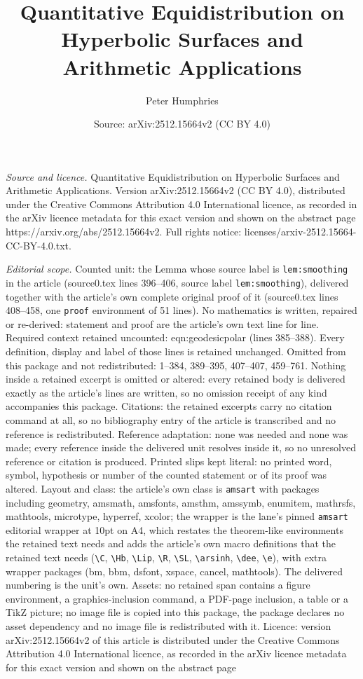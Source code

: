 \documentclass[10pt,a4paper]{amsart}
\title[Quantitative Equidistribution on Hyperbolic Surfaces and Ari]{Quantitative Equidistribution on Hyperbolic Surfaces and Arithmetic Applications}
\author{Peter Humphries}
\date{Source: arXiv:2512.15664v2 (CC BY 4.0)}
\begin{document}
\maketitle

\noindent\emph{Source and licence.} Quantitative Equidistribution on Hyperbolic Surfaces and Arithmetic Applications. Version arXiv:2512.15664v2 (CC BY 4.0), distributed under the Creative Commons Attribution 4.0 International licence, as recorded in the arXiv licence metadata for this exact version and shown on the abstract page https://arxiv.org/abs/2512.15664v2. Full rights notice: licenses/arxiv-2512.15664-CC-BY-4.0.txt.\par\smallskip

\noindent\textit{Editorial scope.} Counted unit: the Lemma whose source label is \texttt{lem:smoothing} in the article (source0.tex lines 396--406, source label \texttt{lem:smoothing}), delivered together with the article's own complete original proof of it (source0.tex lines 408--458, one \texttt{proof} environment of 51 lines). No mathematics is written, repaired or re-derived: statement and proof are the article's own text line for line. Required context retained uncounted: eqn:geodesicpolar (lines 385--388). Every definition, display and label of those lines is retained unchanged. Omitted from this package and not redistributed: 1--384, 389--395, 407--407, 459--761. Nothing inside a retained excerpt is omitted or altered: every retained body is delivered exactly as the article's lines are written, so no omission receipt of any kind accompanies this package. Citations: the retained excerpts carry no citation command at all, so no bibliography entry of the article is transcribed and no reference is redistributed. Reference adaptation: none was needed and none was made; every reference inside the delivered unit resolves inside it, so no unresolved reference or citation is produced. Printed slips kept literal: no printed word, symbol, hypothesis or number of the counted statement or of its proof was altered. Layout and class: the article's own class is \texttt{amsart} with packages including geometry, amsmath, amsfonts, amsthm, amssymb, enumitem, mathrsfs, mathtools, microtype, hyperref, xcolor; the wrapper is the lane's pinned \texttt{amsart} editorial wrapper at 10pt on A4, which restates the theorem-like environments the retained text needs and adds the article's own macro definitions that the retained text needs (\texttt{\textbackslash C}, \texttt{\textbackslash Hb}, \texttt{\textbackslash Lip}, \texttt{\textbackslash R}, \texttt{\textbackslash SL}, \texttt{\textbackslash arsinh}, \texttt{\textbackslash dee}, \texttt{\textbackslash e}), with extra wrapper packages (bm, bbm, dsfont, xspace, cancel, mathtools). The delivered numbering is the unit's own. Assets: no retained span contains a figure environment, a graphics-inclusion command, a PDF-page inclusion, a table or a TikZ picture; no image file is copied into this package, the package declares no asset dependency and no image file is redistributed with it. Licence: version arXiv:2512.15664v2 of this article is distributed under the Creative Commons Attribution 4.0 International licence, as recorded in the arXiv licence metadata for this exact version and shown on the abstract page 
\end{document}
